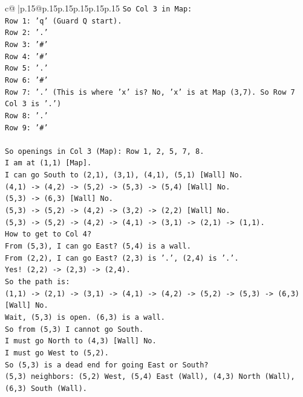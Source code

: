 \documentclass{article}
\begin{document}
{\begin{supertabular}{c@{$\;$}|p{.15\linewidth}@{}p{.15\linewidth}p{.15\linewidth}p{.15\linewidth}p{.15\linewidth}p{.15\linewidth}}
{{{\texttt{So Col 3 in Map:} \\
\texttt{Row 1: 'q' (Guard Q start).} \\
\texttt{Row 2: '.'} \\
\texttt{Row 3: '\#'} \\
\texttt{Row 4: '\#'} \\
\texttt{Row 5: '.'} \\
\texttt{Row 6: '\#'} \\
\texttt{Row 7: '.' (This is where 'x' is? No, 'x' is at Map (3,7). So Row 7 Col 3 is '.')} \\
\texttt{Row 8: '.'} \\
\texttt{Row 9: '\#'} \\
\\ 
\texttt{So openings in Col 3 (Map): Row 1, 2, 5, 7, 8.} \\
\texttt{I am at (1,1) {[}Map{]}.} \\
\texttt{I can go South to (2,1), (3,1), (4,1), (5,1) {[}Wall{]} No.} \\
\texttt{(4,1) {-}> (4,2) {-}> (5,2) {-}> (5,3) {-}> (5,4) {[}Wall{]} No.} \\
\texttt{(5,3) {-}> (6,3) {[}Wall{]} No.} \\
\texttt{(5,3) {-}> (5,2) {-}> (4,2) {-}> (3,2) {-}> (2,2) {[}Wall{]} No.} \\
\texttt{(5,3) {-}> (5,2) {-}> (4,2) {-}> (4,1) {-}> (3,1) {-}> (2,1) {-}> (1,1).} \\
\texttt{How to get to Col 4?} \\
\texttt{From (5,3), I can go East? (5,4) is a wall.} \\
\texttt{From (2,2), I can go East? (2,3) is '.', (2,4) is '.'.} \\
\texttt{Yes! (2,2) {-}> (2,3) {-}> (2,4).} \\
\texttt{So the path is:} \\
\texttt{(1,1) {-}> (2,1) {-}> (3,1) {-}> (4,1) {-}> (4,2) {-}> (5,2) {-}> (5,3) {-}> (6,3) {[}Wall{]} No.} \\
\texttt{Wait, (5,3) is open. (6,3) is a wall.} \\
\texttt{So from (5,3) I cannot go South.} \\
\texttt{I must go North to (4,3) {[}Wall{]} No.} \\
\texttt{I must go West to (5,2).} \\
\texttt{So (5,3) is a dead end for going East or South?} \\
\texttt{(5,3) neighbors: (5,2) West, (5,4) East (Wall), (4,3) North (Wall), (6,3) South (Wall).} \\
}}}
\end{supertabular}}
\end{document}
